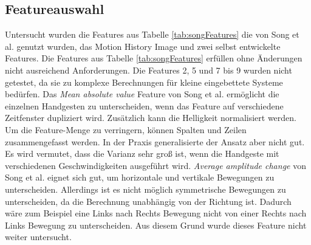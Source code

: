\subsection{Featureauswahl}
\label{sec:feature_selection}
Untersucht wurden die Features aus Tabelle \ref{tab:songFeatures} die von Song et al. genutzt wurden, das Motion History Image und zwei selbst entwickelte Features. Die Features aus
Tabelle \ref{tab:songFeatures} erfüllen ohne Änderungen nicht ausreichend Anforderungen. Die Features 2, 5 und 7 bis 9 wurden nicht getestet, da sie zu komplexe Berechnungen
für kleine eingebettete Systeme bedürfen.
\newline
\newline
Das \textit{Mean absolute value} Feature von Song et al. ermöglicht die einzelnen Handgesten zu unterscheiden, wenn das Feature auf verschiedene Zeitfenster dupliziert wird. Zusätzlich kann die Helligkeit
normalisiert werden. Um die Feature-Menge zu verringern, können Spalten und Zeilen zusammengefasst werden. In der Praxis generalisierte der Ansatz aber nicht gut. Es wird vermutet, dass die Varianz sehr groß
ist, wenn die Handgeste mit verschiedenen Geschwindigkeiten ausgeführt wird.
\newline
\newline
\textit{Average amplitude change} von Song et al. eignet sich gut, um horizontale und vertikale Bewegungen zu unterscheiden. Allerdings ist es nicht möglich symmetrische Bewegungen zu unterscheiden, da
die Berechnung unabhängig von der Richtung ist. Dadurch wäre zum Beispiel eine Links nach Rechts Bewegung nicht von einer Rechts nach Links Bewegung zu unterscheiden. Aus diesem Grund wurde dieses Feature nicht
weiter untersucht.

